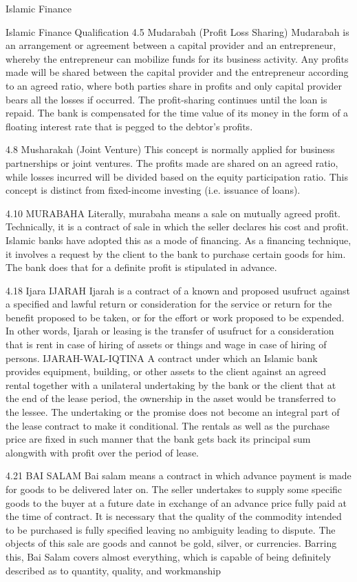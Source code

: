 Islamic Finance
 
Islamic Finance Qualification
4.5 Mudarabah (Profit Loss Sharing)
Mudarabah is an arrangement or agreement between a capital provider and an entrepreneur, whereby the entrepreneur can mobilize funds for its business activity. Any profits made will be shared between the capital provider and the entrepreneur according to an agreed ratio, where both parties share in profits and only capital provider bears all the losses if occurred. The profit-sharing continues until the loan is repaid. The bank is compensated for the time value of its money in the form of a floating interest rate that is pegged to the debtor's profits.

4.8 Musharakah (Joint Venture)
This concept is normally applied for business partnerships or joint ventures. The profits made are shared on an agreed ratio, while losses incurred will be divided based on the equity participation ratio. This concept is distinct from fixed-income investing (i.e. issuance of loans).
 
4.10 MURABAHA
Literally, murabaha means a sale on mutually agreed profit. Technically, it is a contract of sale in which the seller declares his cost and profit. Islamic banks have adopted this as a mode of financing. As a financing technique, it involves a request by the client to the bank to purchase certain goods for him. The bank does that for a definite profit is stipulated in advance.
 
4.18 Ijara
IJARAH
Ijarah is a contract of a known and proposed usufruct against a specified and lawful return or consideration for the service or return for the benefit proposed to be taken, or for the effort or work proposed to be expended. In other words, Ijarah or leasing is the transfer of usufruct for a consideration that is rent in case of hiring of assets or things and wage in case of hiring of persons.
IJARAH-WAL-IQTINA
A contract under which an Islamic bank provides equipment, building, or other assets to the client against an agreed rental together with a unilateral undertaking by the bank or the client that at the end of the lease period, the ownership in the asset would be transferred to the lessee. The undertaking or the promise does not become an integral part of the lease contract to make it conditional. The rentals as well as the purchase price are fixed in such manner that the bank gets back its principal sum alongwith with profit over the period of lease.
 
4.21 BAI SALAM
Bai salam means a contract in which advance payment is made for goods to be delivered later on. The seller undertakes to supply some specific goods to the buyer at a future date in exchange of an advance price fully paid at the time of contract. It is necessary that the quality of the commodity intended to be purchased is fully specified leaving no ambiguity leading to dispute. The objects of this sale are goods and cannot be gold, silver, or currencies. Barring this, Bai Salam covers almost everything, which is capable of being definitely described as to quantity, quality, and workmanship

